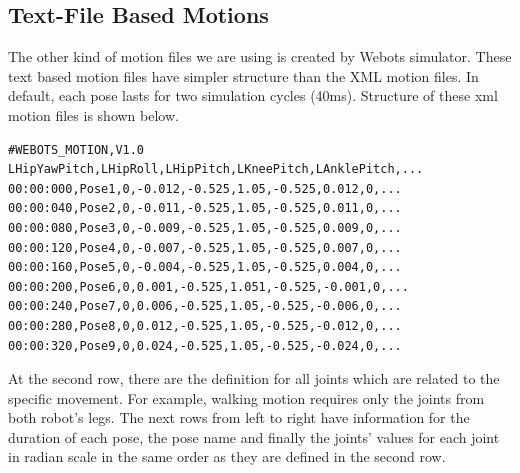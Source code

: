 \subsection{Text-File Based Motions}
The other kind of motion files we are using is created by Webots simulator. These text based motion files have simpler structure than the XML motion files. In default, each pose lasts for two simulation cycles (40ms). Structure of these xml motion files is shown below.
\begin{verbatim}
#WEBOTS_MOTION,V1.0
LHipYawPitch,LHipRoll,LHipPitch,LKneePitch,LAnklePitch,...
00:00:000,Pose1,0,-0.012,-0.525,1.05,-0.525,0.012,0,...
00:00:040,Pose2,0,-0.011,-0.525,1.05,-0.525,0.011,0,...
00:00:080,Pose3,0,-0.009,-0.525,1.05,-0.525,0.009,0,...
00:00:120,Pose4,0,-0.007,-0.525,1.05,-0.525,0.007,0,...
00:00:160,Pose5,0,-0.004,-0.525,1.05,-0.525,0.004,0,...
00:00:200,Pose6,0,0.001,-0.525,1.051,-0.525,-0.001,0,...
00:00:240,Pose7,0,0.006,-0.525,1.05,-0.525,-0.006,0,...
00:00:280,Pose8,0,0.012,-0.525,1.05,-0.525,-0.012,0,...
00:00:320,Pose9,0,0.024,-0.525,1.05,-0.525,-0.024,0,...
\end{verbatim}
At the second row, there are the definition for all joints which are related to the specific movement. For example, walking motion requires only the joints from both robot's legs. The next rows from left to right have information for the duration of each pose, the pose name and finally the joints' values for each joint in radian scale in the same order as they are defined in the second row.


